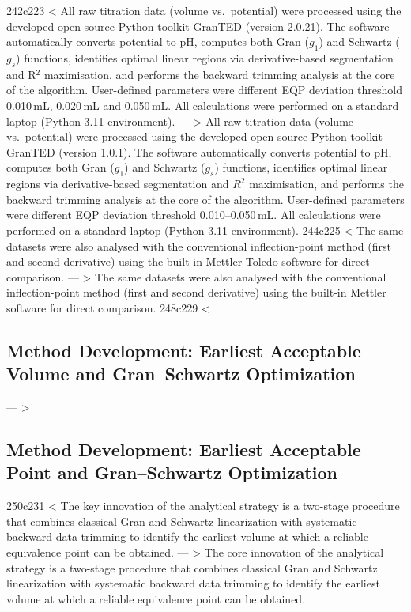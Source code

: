 242c223
< All raw titration data (volume vs.\ potential) were processed using the developed open-source Python toolkit \textsf{GranTED} (version 2.0.21). The software automatically converts potential to pH, computes both Gran (\(g_1\)) and Schwartz (\(g_s\)) functions, identifies optimal linear regions via derivative-based segmentation and R$^2$ maximisation, and performs the backward trimming analysis at the core of the algorithm. User-defined parameters were different EQP deviation threshold 0.010\,mL, 0.020\,mL and 0.050\,mL. All calculations were performed on a standard laptop (Python 3.11 environment).
---
> All raw titration data (volume vs.\ potential) were processed using the developed open-source Python toolkit \textsf{GranTED} (version 1.0.1). The software automatically converts potential to pH, computes both Gran (\(g_1\)) and Schwartz (\(g_s\)) functions, identifies optimal linear regions via derivative-based segmentation and $R^2$ maximisation, and performs the backward trimming analysis at the core of the algorithm. User-defined parameters were different EQP deviation threshold 0.010--0.050\,mL. All calculations were performed on a standard laptop (Python 3.11 environment).
244c225
< The same datasets were also analysed with the conventional inflection-point method (first and second derivative) using the built-in Mettler-Toledo software for direct comparison.
---
> The same datasets were also analysed with the conventional inflection-point method (first and second derivative) using the built-in Mettler software for direct comparison.
248c229
< \subsection*{Method Development: Earliest Acceptable Volume and Gran--Schwartz Optimization}
---
> \subsection*{Method Development: Earliest Acceptable Point and Gran--Schwartz Optimization}
250c231
< The key innovation of the analytical strategy is a two-stage procedure that combines classical Gran and Schwartz linearization with systematic backward data trimming to identify the earliest volume at which a reliable equivalence point can be obtained. 
---
> The core innovation of the analytical strategy is a two-stage procedure that combines classical Gran and Schwartz linearization with systematic backward data trimming to identify the earliest volume at which a reliable equivalence point can be obtained. 
